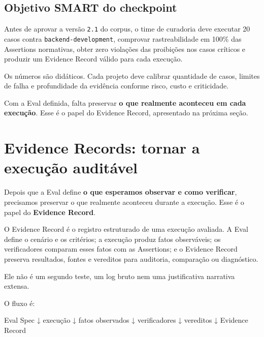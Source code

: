\documentclass[
  10pt,
  a4paper,
  oneside]{book}
\newenvironment{Shaded}{}{}
\newcommand{\NormalTok}[1]{#1}
\renewenvironment{Shaded}{\begin{snugshade}}{\end{snugshade}}%
\begin{document}
\hypertarget{objetivo-smart-do-checkpoint}{%
\subsection{Objetivo SMART do
checkpoint}\label{objetivo-smart-do-checkpoint}}

Antes de aprovar a versão \texttt{2.1} do corpus, o time de curadoria
deve executar 20 casos contra \texttt{backend-development}, comprovar
rastreabilidade em 100\% das Assertions normativas, obter zero violações
das proibições nos casos críticos e produzir um Evidence Record válido
para cada execução.

Os números são didáticos. Cada projeto deve calibrar quantidade de
casos, limites de falha e profundidade da evidência conforme risco,
custo e criticidade.

Com a Eval definida, falta preservar \textbf{o que realmente aconteceu
em cada execução}. Esse é o papel do Evidence Record, apresentado na
próxima seção.

\hypertarget{evidence-records-tornar-a-execuuxe7uxe3o-audituxe1vel}{%
\section{Evidence Records: tornar a execução
auditável}\label{evidence-records-tornar-a-execuuxe7uxe3o-audituxe1vel}}

Depois que a Eval define \textbf{o que esperamos observar e como
verificar}, precisamos preservar o que realmente aconteceu durante a
execução. Esse é o papel do \textbf{Evidence Record}.

O Evidence Record é o registro estruturado de uma execução avaliada. A
Eval define o cenário e os critérios; a execução produz fatos
observáveis; os verificadores comparam esses fatos com as Assertions; e
o Evidence Record preserva resultados, fontes e vereditos para
auditoria, comparação ou diagnóstico.

Ele não é um segundo teste, um log bruto nem uma justificativa narrativa
extensa.

O fluxo é:

\begin{Shaded}
\begin{Highlighting}[]
\NormalTok{Eval Spec}
\NormalTok{    ↓}
\NormalTok{execução}
\NormalTok{    ↓}
\NormalTok{fatos observados}
\NormalTok{    ↓}
\NormalTok{verificadores}
\NormalTok{    ↓}
\NormalTok{vereditos}
\NormalTok{    ↓}
\NormalTok{Evidence Record}
\end{Highlighting}
\end{Shaded}
\end{document}
